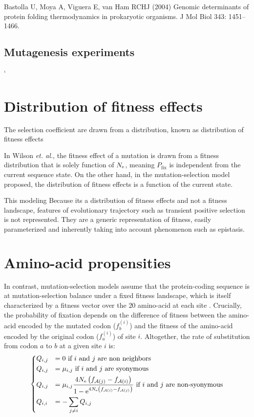 Bastolla U, Moya A, Viguera E, van Ham RCHJ (2004) Genomic determinants of protein folding thermodynamics in prokaryotic organisms. J Mol Biol 343: 1451–1466.

\subsection{Mutagenesis experiments}

`
\section{Distribution of fitness effects}

The selection coefficient are drawn from a distribution, known as distribution of fitness effects
\citep{Welch2008}

In Wilson \textit{et. al.}, the fitness effect of a mutation is drawn from a fitness distribution that is solely function of $N_{\textrm{e}}$, meaning ${P_{\mathrm{fix}}}$ is independent from the current sequence state.
On the other hand, in the mutation-selection model proposed, the distribution of fitness effects is a function of the current state.

This modeling 
Because its a distribution of fitness effects and not a fitness landscape, features of evolutionary trajectory such as transient positive selection is not represented.
They are a generic representation of fitness, easily parameterized and inherently taking into account phenomenon such as epistasis. 

\section{Amino-acid propensities}

In contrast, mutation-selection models assume that the protein-coding sequence is at mutation-selection balance under a fixed fitness landscape, which is itself characterized by a fitness vector over the $20$ amino-acid at each site \citep{Yang2008, Halpern1998, Rodrigue2010}. Crucially, the probability of fixation depends on the difference of fitness between the amino-acid encoded by the mutated \gls{codon} ($f_b^{(i)}$) and the fitness of the amino-acid encoded by the original \gls{codon} ($f_a^{(i)}$) of site $i$. Altogether, the rate of \gls{substitution} from \gls{codon} $a$ to $b$ at a given site $i$ is:
\begin{equation}
\begin{dcases}
Q_{{i}, {j}} & = 0 \text{ if ${i}$ and ${j}$ are non neighbors} \\
Q_{{i}, {j}} & = \mu_{{i}, {j}} \text{ if ${i}$ and ${j}$ are syonymous} \\
Q_{{i}, {j}} & = \mu_{{i}, {j}} \dfrac{4 N_{\textrm{e}} \left({f_{\mathcal{A}({j})} - f_{\mathcal{A}({i})}}\right)}{{1 - \mathrm{e}^{4 N_{\textrm{e}} \left({f_{\mathcal{A}({i})} - f_{\mathcal{A}({j})}}\right)} }} \text{ if ${i}$ and ${j}$ are non-syonymous} \\
Q_{{i}, {i}} & = - \sum_{{j} \neq {i}} Q_{{i}, {j}}
\end{dcases}
\label{eq:propensities-models}
\end{equation}

